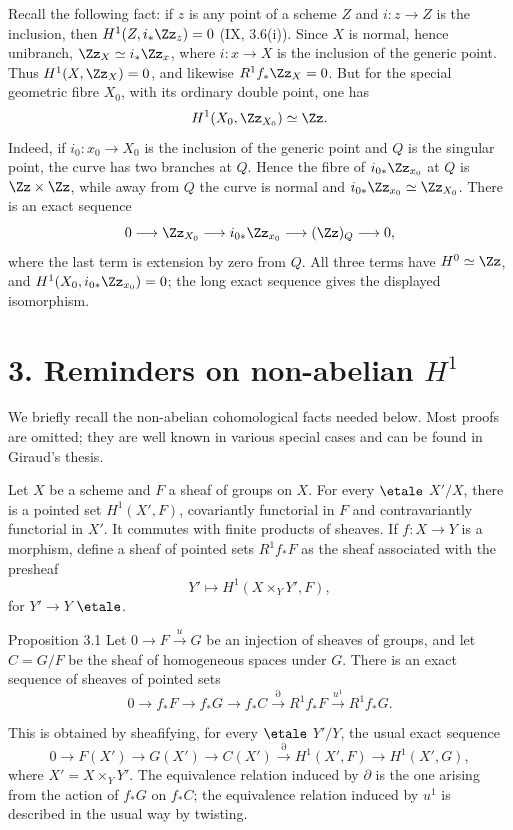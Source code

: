 Recall the following fact: if \(z\) is any point of a scheme \(Z\) and \(i:z\to Z\) is the inclusion, then \(H^1(Z,i_*\Zz_z)=0\) (IX, 3.6(i)). Since \(X\) is normal, hence unibranch, \(\Zz_X\simeq i_*\Zz_x\), where \(i:x\to X\) is the inclusion of the generic point. Thus \(H^1(X,\Zz_X)=0\), and likewise \(R^1f_*\Zz_X=0\). But for the special geometric fibre \(X_0\), with its ordinary double point, one has
\[
H^1(X_0,\Zz_{X_0})\simeq\Zz.
\]
Indeed, if \(i_0:x_0\to X_0\) is the inclusion of the generic point and \(Q\) is the singular point, the curve has two branches at \(Q\). Hence the fibre of \(i_{0*}\Zz_{x_0}\) at \(Q\) is \(\Zz\times\Zz\), while away from \(Q\) the curve is normal and \(i_{0*}\Zz_{x_0}\simeq\Zz_{X_0}\). There is an exact sequence
\[
0\longrightarrow\Zz_{X_0}\longrightarrow i_{0*}\Zz_{x_0}\longrightarrow(\Zz)_Q\longrightarrow0,
\]
where the last term is extension by zero from \(Q\). All three terms have \(H^0\simeq\Zz\), and \(H^1(X_0,i_{0*}\Zz_{x_0})=0\); the long exact sequence gives the displayed isomorphism.

\section*{3. Reminders on non-abelian \(H^1\)}
We briefly recall the non-abelian cohomological facts needed below. Most proofs are omitted; they are well known in various special cases and can be found in Giraud's thesis.

Let \(X\) be a scheme and \(F\) a sheaf of groups on \(X\). For every \(\etale\) \(X'/X\), there is a pointed set \(H^1(X',F)\), covariantly functorial in \(F\) and contravariantly functorial in \(X'\). It commutes with finite products of sheaves. If \(f:X\to Y\) is a morphism, define a sheaf of pointed sets \(R^1f_*F\) as the sheaf associated with the presheaf
\[
Y'\longmapsto H^1(X\times_YY',F),
\]
for \(Y'\to Y\) \(\etale\).

\begin{statement}{Proposition 3.1}
Let \(0\to F\xrightarrow{u}G\) be an injection of sheaves of groups, and let \(C=G/F\) be the sheaf of homogeneous spaces under \(G\). There is an exact sequence of sheaves of pointed sets
\[
0\to f_*F\to f_*G\to f_*C\xrightarrow{\partial}R^1f_*F\xrightarrow{u^1}R^1f_*G.
\]
\end{statement}

This is obtained by sheafifying, for every \(\etale\) \(Y'/Y\), the usual exact sequence
\[
0\to F(X')\to G(X')\to C(X')\xrightarrow{\partial}H^1(X',F)\to H^1(X',G),
\]
where \(X'=X\times_YY'\). The equivalence relation induced by \(\partial\) is the one arising from the action of \(f_*G\) on \(f_*C\); the equivalence relation induced by \(u^1\) is described in the usual way by twisting.

